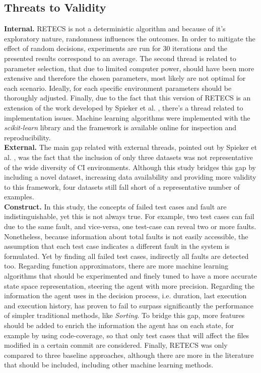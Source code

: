 \subsection{Threats to Validity}
\textbf{Internal.} RETECS is not a deterministic algorithm and because of it's exploratory nature, randomness influences the outcomes. In order to mitigate the effect of random decisions, experiments are run for 30 iterations and the presented results correspond to an average. 
The second thread is related to parameter selection, that due to limited computer power, should have been more extensive and therefore the chosen parameters, most likely are not optimal for each scenario. Ideally, for each specific environment parameters should be thoroughly adjusted. 
Finally, due to the fact that this version of RETECS is an extension of the work developed by Spieker et al. \cite{Spieker}, there's a thread related to implementation issues. Machine learning algorithms were implemented with the \textit{scikit-learn} library and the framework is available online for inspection and reproducibility. 
\\

\textbf{External.} The main gap related with external threads, pointed out by Spieker et al. \cite{Spieker}, was the fact that the inclusion of only three datasets was not representative of the wide diversity of CI environments. Although this study bridges this gap by including a novel dataset, increasing data availability and providing more validity to this framework, four datasets still fall short of a representative number of examples. 
\\

\textbf{Construct.} 
In this study, the concepts of failed test cases and fault are indistinguishable, yet this is not always true. For example, two test cases can fail due to the same fault, and vice-versa, one test-case can reveal two or more faults. Nonetheless, because information about total faults is not easily accessible, the assumption that each test case indicates a different fault in the system is formulated. Yet by finding all failed test cases, indirectly all faults are detected too.
Regarding function approximators, there are more machine learning algorithms that should be experimented and finely tuned to have a more accurate state space representation, steering the agent with more precision.
Regarding the information the agent uses in the decision process, i.e. duration, last execution and execution history, has proven to fail to surpass significantly the performance of simpler traditional methods, like \textit{Sorting}. To bridge this gap, more features should be added to enrich the information the agent has on each state, for example by using code-coverage, so that only test cases that will affect the files modified in a certain commit are considered.
Finally, RETECS was only compared to three baseline approaches, although there are more in the literature that should be included, including other machine learning methods.



